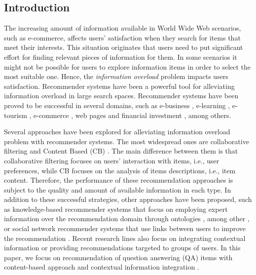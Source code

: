\documentclass[preprint]{elsarticle}
\begin{document}
\begin{spacing}{1.5}
\section{Introduction}\label{sec:introduction}

The increasing amount of information available in World Wide Web scenarios, such as e-commerce, affects users' satisfaction when they search for items that meet their interests. This situation originates that users need to put significant effort for finding relevant pieces of information for them. In some scenarios it might not be possible for users to explore information items in order to select the most suitable one. Hence, the \emph{information overload} problem impacts users satisfaction. Recommender systems have been a powerful tool for alleviating information overload in large search spaces. Recommender systems have been proved to be successful in several domains, such as e-business \cite{Lu2013}, e-learning \cite{Wu2015,Yera2014}, e-tourism \cite{AlHassan2015,Noguera2012}, e-commerce \cite{Rafailidis2016}, web pages \cite{Nguyen2014,Xuan2015} and financial investment \cite{Musto2015}, among others.

Several approaches have been explored for alleviating information overload problem with recommender systems. The most widespread ones are collaborative filtering \cite{Koren2015} and Content Based (CB) \cite{deGemmis2015}. The main difference between them is that collaborative filtering focuses on users' interaction with items, i.e., user preferences, while CB focuses on the analysis of items descriptions, i.e., item content. Therefore, the performance of these recommendation approaches is subject to the quality and amount of available information in each type. In addition to these successful strategies, other approaches have been proposed, such as knowledge-based recommender systems that focus on employing expert information over the recommendation domain through ontologies \cite{Nilashi2018}, among other \cite{Colombo2015,Wu2015}, or social network recommender systems that use links between users to improve the recommendation \cite{Deng2014}. Recent research lines also focus on integrating contextual information \cite{Adomavicius2015} or providing recommendations targeted to groups of users\cite{Castro2017,Masthoff2015}. In this paper, we focus on recommendation of question answering (QA) items with content-based approach and contextual information integration \cite{Kuchmann2015}.


\end{spacing}
\end{document}
